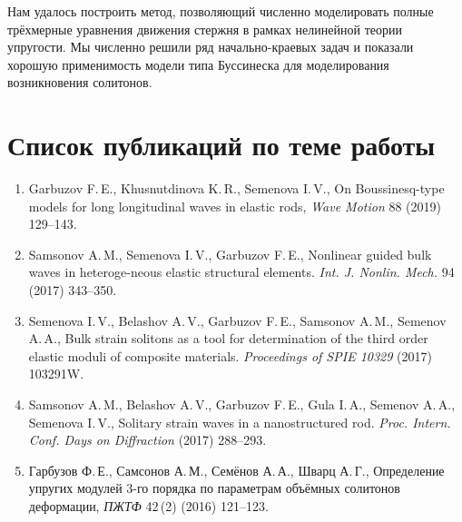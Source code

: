 \documentclass[12pt, a4paper]{article}
\begin{document}
Нам удалось построить метод, позволяющий численно моделировать полные трёхмерные уравнения движения стержня в рамках нелинейной теории упругости. Мы численно решили ряд начально-краевых задач и показали хорошую применимость модели типа Буссинеска для моделирования возникновения солитонов.


\section{Список публикаций по теме работы}
\begin{enumerate}[noitemsep,topsep=1pt]
	\item Garbuzov F.\,E., Khusnutdinova K.\,R., Semenova I.\,V., On Boussinesq-type models for long longitudinal waves in elastic rods, \textit{Wave Motion} 88 (2019) 129--143.
	\item Samsonov A.\,M., Semenova I.\,V., Garbuzov F.\,E.,  Nonlinear guided bulk waves in heteroge-neous elastic structural elements. \textit{Int. J. Nonlin. Mech.} 94 (2017) 343--350.
	\item Semenova I.\,V., Belashov A.\,V., Garbuzov F.\,E., Samsonov A.\,M., Semenov A.\,A., Bulk strain solitons as a tool for determination of the third order elastic moduli of composite materials. \textit{Proceedings of SPIE 10329} (2017) 103291W.
	\item Samsonov A.\,M., Belashov A.\,V., Garbuzov F.\,E., Gula I.\,A., Semenov A.\,A., Semenova I.\,V., Solitary strain waves in a nanostructured rod. \textit{Proc. Intern. Conf. Days on Diffraction} (2017) 288--293.
	\item Гарбузов Ф.\,Е., Самсонов А.\,М., Семёнов А.\,А., Шварц А.\,Г., Определение упругих модулей	3-го порядка по параметрам объёмных солитонов деформации, \textit{ПЖТФ} 42\,(2) (2016) 121--123.
\end{enumerate}
\end{document}
